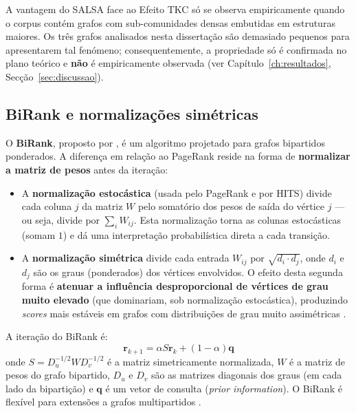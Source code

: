 \begin{notebox}
    A vantagem do SALSA face ao Efeito TKC só se observa
    empiricamente quando o corpus contém grafos com sub-comunidades
    densas embutidas em estruturas maiores. Os três grafos analisados
    nesta dissertação são demasiado pequenos para apresentarem tal
    fenómeno; consequentemente, a propriedade só é confirmada no
    plano teórico e \textbf{não} é empiricamente observada (ver
    Capítulo~\ref{ch:resultados}, Secção~\ref{sec:discussao}).
\end{notebox}

\subsection{BiRank e normalizações simétricas}
\label{sec:birank}

O \textbf{BiRank}, proposto por \citet{he2014}, é um algoritmo
projetado para grafos bipartidos ponderados. A diferença em relação
ao PageRank reside na forma de \textbf{normalizar a matriz de pesos}
antes da iteração:

\begin{itemize}
    \item A \textbf{normalização estocástica} (usada pelo PageRank e
        por HITS) divide cada coluna $j$ da matriz $W$ pelo somatório
        dos pesos de saída do vértice $j$ --- ou seja, divide por
        $\sum_i W_{ij}$. Esta normalização torna as colunas
        estocásticas (somam $1$) e dá uma interpretação probabilística
        direta a cada transição.
    \item A \textbf{normalização simétrica} divide cada entrada
        $W_{ij}$ por $\sqrt{d_i \cdot d_j}$, onde $d_i$ e $d_j$ são
        os graus (ponderados) dos vértices envolvidos. O efeito desta
        segunda forma é \textbf{atenuar a influência desproporcional
        de vértices de grau muito elevado} (que dominariam, sob
        normalização estocástica), produzindo \emph{scores} mais
        estáveis em grafos com distribuições de grau muito
        assimétricas \parencite{he2014, zhou2004}.
\end{itemize}

A iteração do BiRank é:
\begin{equation}
    \mathbf{r}_{k+1} = \alpha S\mathbf{r}_{k} + (1 - \alpha)\mathbf{q}
    \label{eq:birank}
\end{equation}
onde $S = D_{u}^{-1/2} W D_{v}^{-1/2}$ é a matriz simetricamente
normalizada, $W$ é a matriz de pesos do grafo bipartido, $D_u$ e $D_v$
são as matrizes diagonais dos graus (em cada lado da bipartição) e
$\mathbf{q}$ é um vetor de consulta (\emph{prior information}). O
BiRank é flexível para extensões a grafos multipartidos
\parencite{he2015}.

